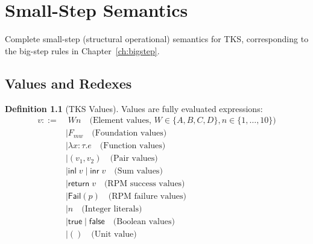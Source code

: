 \documentclass[11pt,twoside,openright]{book}
\theoremstyle{definition}
\newtheorem{definition}{Definition}[chapter]
\theoremstyle{plain}
\theoremstyle{remark}
\newcommand{\rpmret}{\mathsf{return}}
\newcommand{\Failed}{\mathsf{Fail}}
\newcommand{\vnew}{\textcolor{blue!70!black}{\textbf{[NEW v7.0]}}}
\begin{document}


\chapter{Small-Step Semantics}
\label{ch:smallstep}

\begin{tcolorbox}[colback=blue!5!white,colframe=blue!75!black,title=\vnew]
Complete small-step (structural operational) semantics for TKS, corresponding to the big-step rules in Chapter~\ref{ch:bigstep}.
\end{tcolorbox}

\section{Values and Redexes}

\begin{definition}[TKS Values]
\label{def:tks-values}
Values are fully evaluated expressions:
\begin{align}
v ::=&\; Wn \quad \text{(Element values, } W \in \{A,B,C,D\}, n \in \{1,\ldots,10\}) \\
    &\mid F_{mw} \quad \text{(Foundation values)} \\
    &\mid \lambda x:\tau. e \quad \text{(Function values)} \\
    &\mid (v_1, v_2) \quad \text{(Pair values)} \\
    &\mid \mathsf{inl}\; v \mid \mathsf{inr}\; v \quad \text{(Sum values)} \\
    &\mid \rpmret\; v \quad \text{(RPM success values)} \\
    &\mid \Failed(p) \quad \text{(RPM failure values)} \\
    &\mid n \quad \text{(Integer literals)} \\
    &\mid \mathsf{true} \mid \mathsf{false} \quad \text{(Boolean values)} \\
    &\mid () \quad \text{(Unit value)}
\end{align}
\end{definition}
\end{document}
